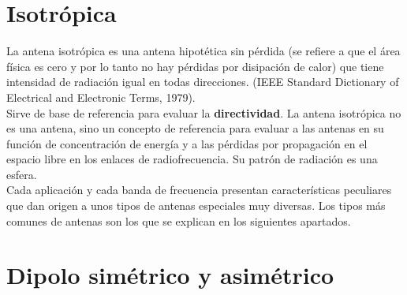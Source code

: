 \documentclass[
	12pt, %
	fleqn, %
	a4paper, %
	oneside, %
]{LegrandOrangeBook}
\begin{document}
\section{Isotrópica}
La antena isotrópica es una antena hipotética sin pérdida (se refiere a que el área física es cero y por lo tanto no hay pérdidas por disipación de calor) que tiene intensidad de radiación igual en todas direcciones. (IEEE Standard Dictionary of Electrical and Electronic Terms, 1979). \\
Sirve de base de referencia para evaluar la \textbf{directividad}. La antena isotrópica no es una antena, sino un concepto de referencia para evaluar a las antenas en su función de concentración de energía y a las pérdidas por propagación en el espacio libre en los enlaces de radiofrecuencia. Su patrón de radiación es una esfera.\\
Cada aplicación y cada banda de frecuencia presentan características peculiares que dan origen a
unos tipos de antenas especiales muy diversas. Los tipos más comunes de antenas son los que se
explican en los siguientes apartados.
\section{Dipolo simétrico y asimétrico}
\end{document}
